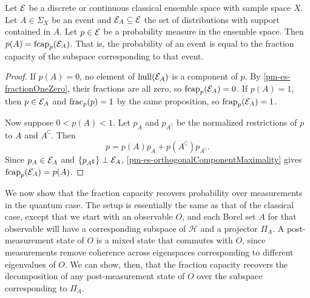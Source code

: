 \begin{mathSection}
	\begin{prop}
		Let $\mathcal{E}$ be a discrete or continuous classical ensemble space with sample space $X$. Let $A \in \Sigma_X$ be an event and $\mathcal{E}_A \subseteq \mathcal{E}$ the set of distributions with support contained in $A$. Let $p \in \mathcal{E}$ be a probability measure in the ensemble space. Then $p(A) = \mathrm{fcap}_{p}(\mathcal{E}_A)$. That is, the probability of an event is equal to the fraction capacity of the subspace corresponding to that event.
	\end{prop}
\begin{proof}
	If $p(A)=0$, no element of $\mathrm{hull}(\mathcal{E}_A)$ is a component of $p$. By \ref{pm-es-fractionOneZero}, their fractions are all zero, so $\mathrm{fcap}_p(\mathcal{E}_A)=0$. If $p(A)=1$, then $p \in \mathcal{E}_A$ and $\mathrm{frac}_p(p)=1$ by the same proposition, so $\mathrm{fcap}_p(\mathcal{E}_A)=1$.
	
	Now suppose $0<p(A)<1$. Let $p_A$ and $p_{A^{\complement}}$ be the normalized restrictions of $p$ to $A$ and $A^{\complement}$. Then
	\begin{equation}
		p=p(A)p_A+p(A^{\complement})p_{A^{\complement}}.
	\end{equation}
	Since $p_A \in \mathcal{E}_A$ and $\{p_{A^{\complement}}\} \perp \mathcal{E}_A$, \ref{pm-es-orthogonalComponentMaximality} gives $\mathrm{fcap}_p(\mathcal{E}_A)=p(A)$.
	\end{proof}
\end{mathSection}
	
We now show that the fraction capacity recovers probability over measurements in the quantum case. The setup is essentially the same as that of the classical case, except that we start with an observable $O$, and each Borel set $A$ for that observable will have a corresponding subspace of $\mathcal{H}$ and a projector $\Pi_A$. A post-measurement state of $O$ is a mixed state that commutes with $O$, since measurements remove coherence across eigenspaces corresponding to different eigenvalues of $O$. We can show, then, that the fraction capacity recovers the decomposition of any post-measurement state of $O$ over the subspace corresponding to $\Pi_A$.

